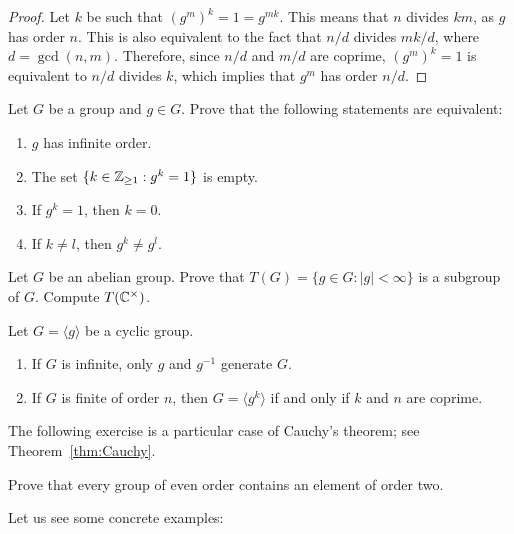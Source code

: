 \begin{proof}
  Let $k$ be such that $(g^m)^k=1=g^{mk}$. This means that $n$ divides $km$, as $g$
  has order $n$. This is also equivalent to the fact that
  $n/d$ divides $mk/d$, where $d=\gcd(n,m)$. Therefore, since $n/d$ and $m/d$
  are coprime, $(g^m)^k=1$ is equivalent to
  $n/d$ divides $k$, which implies that $g^m$ has order $n/
  d$.
\end{proof}

\begin{exercise}
        Let $G$ be a group and $g\in G$. Prove that the following statements are equivalent:
        \begin{enumerate}
        \item $g$ has infinite order. 
        \item The set $\{k\in\mathbb{Z}_{\geq1}:g^k=1\}$ is empty.
        \item If $g^k=1$, then $k=0$.
        \item If $k\ne l$, then $g^k\ne g^l$.
        \end{enumerate}
\end{exercise}

\begin{exercise}
  Let $G$ be an abelian group. Prove that
  $T(G)=\{g\in G:|g|<\infty\}$ is a subgroup of $G$. Compute $T(\mathbb{C}^\times)$.
\end{exercise}

\begin{exercise}
        Let $G=\langle g\rangle$ be a cyclic group. 
        \begin{enumerate}
                \item If $G$ is infinite, only $g$ and $g^{-1}$ generate $G$.
                \item If $G$ is finite of order $n$, then 
                        $G=\langle g^k\rangle$ if and only if $k$ and $n$ are coprime.
        \end{enumerate}
\end{exercise}
                
The following exercise is a particular 
case of Cauchy's theorem; see Theorem~\ref{thm:Cauchy}. 

\begin{exercise}
        \label{xca:orden2}
        Prove that every group of even order contains
        an element of order two. 
\end{exercise}
                
Let us see some concrete examples: 

